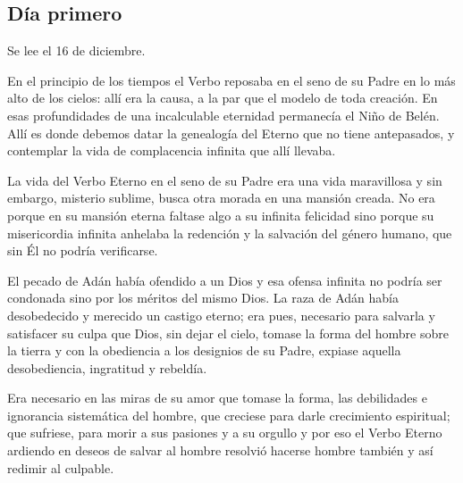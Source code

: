 \documentclass[spanish,utf8,twocolumn]{chlart}
\newenvironment{summary}{\begingroup
	\small\sffamily\itshape%
	\setlength{\leftskip}{3em}\setlength{\rightskip}{3em}\noindent
	}{\par\endgroup}
\newenvironment{lectura}{\begingroup\color{lector}}{\endgroup\par}
\begin{document}
\subsection*{Día primero}
\begin{summary}
Se lee el 16 de diciembre.
\end{summary}
\begin{lectura}
En el principio de los tiempos el Verbo reposaba en el seno de su Padre
en lo más alto de los cielos:
allí era la causa, a la par que el modelo de toda creación.
En esas profundidades de una incalculable eternidad permanecía el Niño
de Belén.
Allí es donde debemos datar la genealogía del Eterno que no tiene
antepasados, y contemplar la vida de complacencia infinita que allí
llevaba.

La vida del Verbo Eterno en el seno de su Padre era una vida maravillosa
y sin embargo, misterio sublime, busca otra morada en una mansión
creada.
No era porque en su mansión eterna faltase algo a su infinita felicidad
sino porque su misericordia infinita anhelaba la redención y la
salvación del género humano, que sin Él no podría verificarse.

El pecado de Adán había ofendido a un Dios y esa ofensa infinita no
podría ser condonada sino por los méritos del mismo Dios.
La raza de Adán había desobedecido y merecido un castigo eterno; era
pues, necesario para salvarla y satisfacer su culpa que Dios, sin dejar
el cielo, tomase la forma del hombre sobre la tierra y con la obediencia
a los designios de su Padre, expiase aquella desobediencia, ingratitud y
rebeldía.

Era necesario en las miras de su amor que tomase la forma, las
debilidades e ignorancia sistemática del hombre, que creciese para darle
crecimiento espiritual; que sufriese, para morir a sus pasiones y a su
orgullo y por eso el Verbo Eterno ardiendo en deseos de salvar al hombre
resolvió hacerse hombre también y así redimir al culpable.
\end{lectura}
\end{document}
